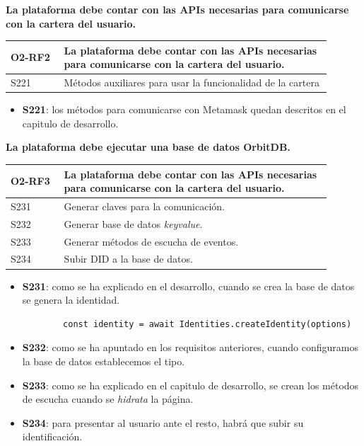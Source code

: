 \textbf{La plataforma debe contar con las APIs necesarias para comunicarse con la cartera del usuario.}
\begin{center}
    \begin{table}[h!]
        \begin{tabular}{|p{0.15\linewidth} | p{0.75\linewidth}|}
            \hline
             
            \textbf{O2-RF2} & \textbf{La plataforma debe contar con las APIs necesarias para comunicarse con la cartera del usuario.} \\
            \hline
            S221     & Métodos auxiliares para usar la funcionalidad de la cartera \\
            \hline
        \end{tabular}
    \end{table}
\end{center}
\begin{itemize}
    \item \textbf{S221}: los métodos para comunicarse con Metamask quedan descritos en el capitulo de desarrollo.
\end{itemize}
\textbf{La plataforma debe ejecutar una base de datos OrbitDB.}
\begin{center}
    \begin{table}[h!]
        \begin{tabular}{|p{0.15\linewidth} | p{0.75\linewidth}|}
            \hline
             
            \textbf{O2-RF3} & \textbf{La plataforma debe contar con las APIs necesarias para comunicarse con la cartera del usuario.} \\
            \hline
            S231     & Generar claves para la comunicación. \\
            \hline
            S232     & Generar base de datos \textit{keyvalue}. \\
            \hline
            S233     & Generar métodos de escucha de eventos. \\
            \hline
            S234     & Subir DID a la base de datos. \\
            \hline
        \end{tabular}
    \end{table}
\end{center}
\begin{itemize}
    \item \textbf{S231}: como se ha explicado en el desarrollo, cuando se crea la base de datos se genera la identidad.
    \begin{lstlisting}
        const identity = await Identities.createIdentity(options)
    \end{lstlisting}
    \item \textbf{S232}: como se ha apuntado en los requisitos anteriores, cuando configuramos la base de datos establecemos el tipo.
    \item \textbf{S233}: como se ha explicado en el capitulo de desarrollo, se crean los métodos de escucha cuando se \textit{hidrata} la página.
    \item \textbf{S234}: para presentar al usuario ante el resto, habrá que subir su identificación.
\end{itemize}
